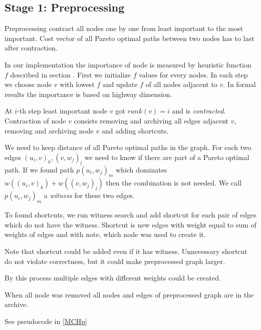 

\subsection{Stage 1: Preprocessing}

Preprocessing contract all nodes one by one from least important to the most important. 
Cost vector of all Pareto optimal paths between two nodes has to last after contraction.

In our implementation the importance of node is measured by heuristic function $f$
described in section . 
First we initialize $f$ values for every nodes. In each step we choose node $v$ with 
lowest $f$ and update $f$ of all nodes adjacent to $v$.
In formal results the importance is based on highway dimension.

At $i$-th step least important node $v$ got $rank(v) = i$ and is \emph{contracted}. 
Contraction of node $v$ consists removing and archiving all edges adjacent $v$, removing 
and archiving node $v$ and adding shortcuts. 

We need to keep distance of all Pareto optimal paths in the graph. 
For each two edges $(u_i,v)_k,(v,w_j)_l$ we need to know if there
are part of a Pareto optimal path. If we found path $p(u_i,w_j)_m$ which dominates
$w((u_i,v)_k)+w((v,w_j)_l)$ then the combination is not needed. 
We call $p(u_i,w_j)_m$ a \emph{witness} for these two edges. 

To found shortcuts, we run witness search and add shortcut for each pair of edges
which do not have the witness. Shortcut is new edges with weight equal to sum
of weights of edges and with note, which node was used to create it.

Note that shortcut could be added even if it has witness. 
Unnecessary shortcut do not violate correctness, but it could make preprocessed graph larger.

By this process multiple edges with different weights could be created. 

When all node was removed all nodes and edges of preprocessed graph are in the archive.

See pseudocode in \ref{MCHp}

